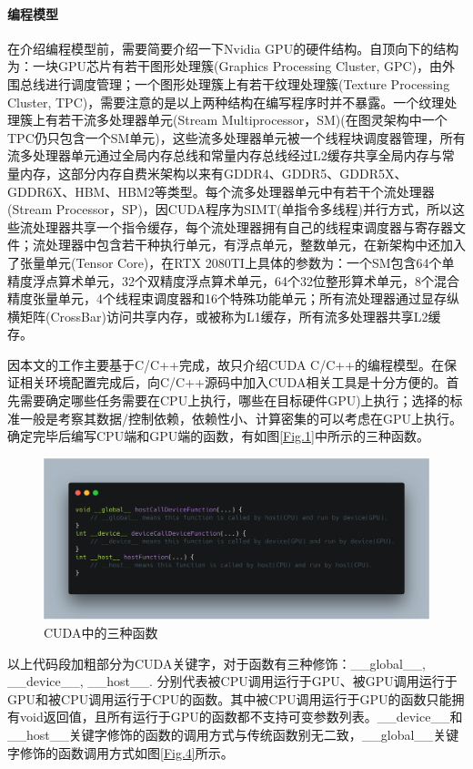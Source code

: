 \paragraph{编程模型}
\par 在介绍编程模型前，需要简要介绍一下Nvidia GPU的硬件结构。自顶向下的结构为：一块GPU芯片有若干图形处理簇(Graphics Processing Cluster, GPC)，由外围总线进行调度管理；一个图形处理簇上有若干纹理处理簇(Texture Processing Cluster, TPC)，需要注意的是以上两种结构在编写程序时并不暴露。一个纹理处理簇上有若干流多处理器单元(Stream Multiprocessor，SM)(在图灵架构中一个TPC仍只包含一个SM单元)，这些流多处理器单元被一个线程块调度器管理，所有流多处理器单元通过全局内存总线和常量内存总线经过L2缓存共享全局内存与常量内存，这部分内存自费米架构以来有GDDR4、GDDR5、GDDR5X、GDDR6X、HBM、HBM2等类型。每个流多处理器单元中有若干个流处理器(Stream Processor，SP)，因CUDA程序为SIMT(单指令多线程)并行方式，所以这些流处理器共享一个指令缓存，每个流处理器拥有自己的线程束调度器与寄存器文件；流处理器中包含若干种执行单元，有浮点单元，整数单元，在新架构中还加入了张量单元(Tensor Core)，在RTX 2080TI上具体的参数为：一个SM包含64个单精度浮点算术单元，32个双精度浮点算术单元，64个32位整形算术单元，8个混合精度张量单元，4个线程束调度器和16个特殊功能单元；所有流处理器通过显存纵横矩阵(CrossBar)访问共享内存，或被称为L1缓存\parencite{EXPLORING}，所有流多处理器共享L2缓存。
\par 因本文的工作主要基于C/C++完成，故只介绍CUDA C/C++的编程模型。在保证相关环境配置完成后，向C/C++源码中加入CUDA相关工具是十分方便的。首先需要确定哪些任务需要在CPU上执行，哪些在目标硬件GPU)上执行；选择的标准一般是考察其数据/控制依赖，依赖性小、计算密集的可以考虑在GPU上执行。确定完毕后编写CPU端和GPU端的函数，有如图\ref{Fig.1}中所示的三种函数。
\begin{figure}
	\centering
	\includegraphics[width=15cm]{figures/CODE1.png}
	\caption{\label{Fig.2} CUDA中的三种函数}
\end{figure}
\par 以上代码段加粗部分为CUDA关键字，对于函数有三种修饰：\_\_global\_\_, \_\_device\_\_, \_\_host\_\_. 分别代表被CPU调用运行于GPU、被GPU调用运行于GPU和被CPU调用运行于CPU的函数。其中被CPU调用运行于GPU的函数只能拥有void返回值，且所有运行于GPU的函数都不支持可变参数列表\parencite{EVENEASIER}。\_\_device\_\_和\_\_host\_\_关键字修饰的函数的调用方式与传统函数别无二致，\_\_global\_\_关键字修饰的函数调用方式如图\ref{Fig.4}所示。
